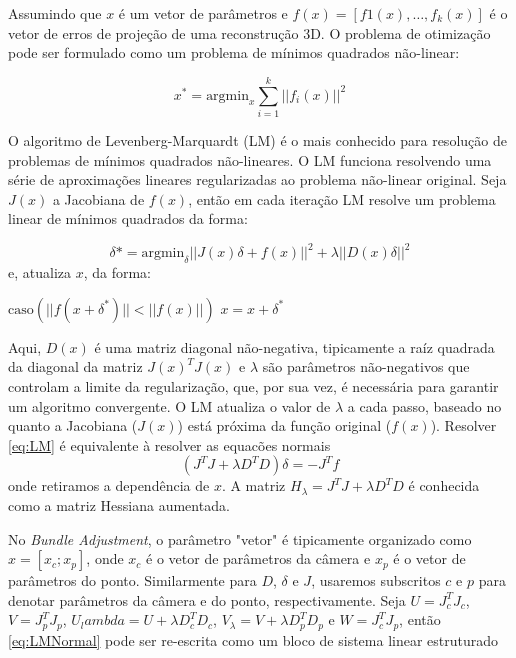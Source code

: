 \begin{itemize}
Assumindo que $x$ é um vetor de parâmetros e $f(x) = [f1(x), \dots, f_k(x)]$ é o vetor de erros de projeção de uma reconstrução 3D. O problema de otimização pode ser  formulado como um problema de mínimos quadrados não-linear:

\begin{equation}
x^* = \text{argmin}_x \sum_{i=1}^k || f_i(x)||^2
\end{equation}

O algoritmo de Levenberg-Marquardt (LM) é o mais conhecido para resolução de problemas de mínimos quadrados não-lineares. O LM funciona resolvendo uma série de aproximações lineares regularizadas ao problema não-linear original. Seja $J(x)$ a Jacobiana de $f(x)$, então em cada iteração LM resolve um problema linear de mínimos quadrados da forma:

\begin{equation}
\label{eq:LM}
\delta* = \text{argmin}_\delta || J(x)\delta + f(x) ||^2 + \lambda ||D(x)\delta||^2 
\end{equation}
e, atualiza $x$, da forma:

\begin{algorithm}
\label{LMattX}
\begin{algorithmic}[1]
\State $\text{caso} (||f(x + \delta^*)|| < || f(x) ||)$
\State	$x = x + \delta^*$
\end{algorithmic}
\end{algorithm}


Aqui, $D(x)$ é uma matriz diagonal não-negativa, tipicamente a raíz quadrada da diagonal da matriz $J(x)^T J(x)$ e $\lambda$ são parâmetros não-negativos que controlam a limite da regularização, que, por sua vez, é necessária para garantir um algoritmo convergente. O LM atualiza o valor de $\lambda$ a cada passo, baseado no quanto a Jacobiana ($J(x)$) está próxima da função original ($f(x)$).
Resolver \ref{eq:LM} é equivalente à resolver as equacões normais
\begin{equation}
\label{eq:LMNormal}
(J^T J + \lambda D^T D)\delta = -J^T f
\end{equation}
onde retiramos a dependência de $x$. A matriz $H_\lambda = J^T J + \lambda D^T D$ é conhecida como a matriz Hessiana aumentada. 

No \textit{Bundle Adjustment}, o parâmetro "vetor" é tipicamente organizado como $x = [x_c;x_p]$, onde $x_c$ é o vetor de parâmetros da câmera e $x_p$ é o vetor de parâmetros do ponto. Similarmente para $D$, $\delta$ e $J$, usaremos subscritos $c$ e $p$ para denotar parâmetros da câmera e do ponto, respectivamente. 
Seja $U = J_c^T J_c$, $V = J_p^T J_p$, $U_lambda = U + \lambda D_c^T D_c$, $V_\lambda = V + \lambda D_p^T D_p$ e $W = J_c^T J_p$, então \ref{eq:LMNormal} pode ser re-escrita como um bloco de sistema linear estruturado


\end{itemize}
